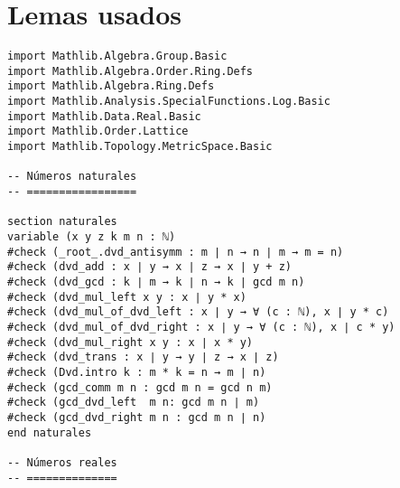 \chapter*{Lemas usados}
\begin{verbatim}
import Mathlib.Algebra.Group.Basic
import Mathlib.Algebra.Order.Ring.Defs
import Mathlib.Algebra.Ring.Defs
import Mathlib.Analysis.SpecialFunctions.Log.Basic
import Mathlib.Data.Real.Basic
import Mathlib.Order.Lattice
import Mathlib.Topology.MetricSpace.Basic

-- Números naturales
-- =================

section naturales
variable (x y z k m n : ℕ)
#check (_root_.dvd_antisymm : m ∣ n → n ∣ m → m = n)
#check (dvd_add : x ∣ y → x ∣ z → x ∣ y + z)
#check (dvd_gcd : k ∣ m → k ∣ n → k ∣ gcd m n)
#check (dvd_mul_left x y : x ∣ y * x)
#check (dvd_mul_of_dvd_left : x ∣ y → ∀ (c : ℕ), x ∣ y * c)
#check (dvd_mul_of_dvd_right : x ∣ y → ∀ (c : ℕ), x ∣ c * y)
#check (dvd_mul_right x y : x ∣ x * y)
#check (dvd_trans : x ∣ y → y ∣ z → x ∣ z)
#check (Dvd.intro k : m * k = n → m ∣ n)
#check (gcd_comm m n : gcd m n = gcd n m)
#check (gcd_dvd_left  m n: gcd m n ∣ m)
#check (gcd_dvd_right m n : gcd m n ∣ n)
end naturales

-- Números reales
-- ==============


\end{verbatim}
